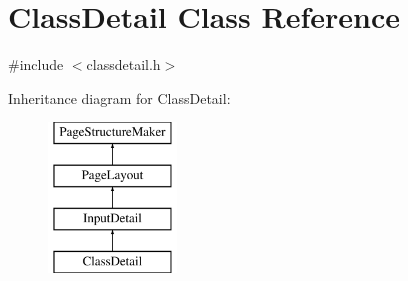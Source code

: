 \hypertarget{classClassDetail}{\section{Class\-Detail Class Reference}
\label{classClassDetail}
}


{\ttfamily \#include $<$classdetail.\-h$>$}

Inheritance diagram for Class\-Detail\-:\begin{figure}[H]
\begin{center}
\leavevmode
\includegraphics[height=4.000000cm]{classClassDetail}
\end{center}
\end{figure}

